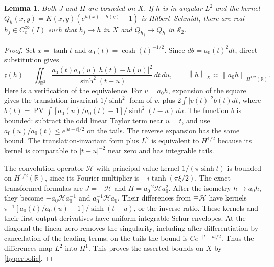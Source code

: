 \documentclass[a4paper,11pt]{amsart}
\newtheorem{lemma}[theorem]{Lemma}
\theoremstyle{remark}\newtheorem{remark}[theorem]{Remark}
\newcommand{\PV}{\operatorname{PV}}
\newcommand{\HS}{\mathcal S_2}
\newcommand{\R}{\mathbb R}
\newcommand{\dd}{\,d}
\newcommand{\norm}[1]{\left\lVert#1\right\rVert}
\begin{document}
\begin{lemma}\label{weighted-approximation}
Both $J$ and $H$ are bounded on $X$. If $h$ is in angular $L^2$ and
the kernel $Q_h(x,y)=K(x,y)(e^{h(x)-h(y)}-1)$ is Hilbert--Schmidt,
there are real $h_j\in C_c^\infty(I)$ such that
$h_j\to h$ in $X$ and $Q_{h_j}\to Q_h$ in $\HS$.
\end{lemma}

\begin{proof}
Set $x=\tanh t$ and $a_0(t)=\cosh(t)^{-1/2}$.
Since $d\theta=a_0(t)^2dt$, direct substitution gives
\begin{equation}\label{hyperbolic}
 \mathfrak e(h)=\iint_{\R^2}
 \frac{a_0(t)a_0(u)|h(t)-h(u)|^2}{\sinh^2(t-u)}\dd t\dd u,
 \qquad \norm h_X\asymp\norm{a_0h}_{H^{1/2}(\R)}.
\end{equation}
Here is a verification of the equivalence. For $v=a_0h$, expansion
of the square gives the translation-invariant $1/\sinh^2$ form of
$v$, plus $2\int |v(t)|^2 b(t)dt$, where
$b(t)=\PV\int[a_0(u)/a_0(t)-1]/\sinh^2(t-u)\dd u$.
The function $b$ is bounded: subtract the odd linear Taylor term
near $u=t$, and use $a_0(u)/a_0(t)\le e^{|u-t|/2}$ on the tails.
The reverse expansion has the same bound. The translation-invariant
form plus $L^2$ is equivalent to $H^{1/2}$ because its kernel is
comparable to $|t-u|^{-2}$ near zero and has integrable tails.

The convolution operator $\mathscr H$ with principal-value kernel
$1/(\pi\sinh t)$ is bounded on $H^{1/2}(\R)$, since its Fourier
multiplier is $-i\tanh(\pi\xi/2)$.
The exact transformed formulas are
$J=-\mathscr H$ and $H=a_0^{-2}\mathscr H a_0^2$.
After the isometry $h\mapsto a_0h$, they become
$-a_0\mathscr H a_0^{-1}$ and $a_0^{-1}\mathscr H a_0$.
Their differences from $\mp\mathscr H$ have kernels
$\pi^{-1}[a_0(t)/a_0(u)-1]/\sinh(t-u)$, or the inverse ratio.
These kernels and their first output derivatives have uniform
integrable Schur envelopes. At the diagonal the linear zero
removes the singularity, including after differentiation by
cancellation of the leading terms; on the tails the bound is
$Ce^{-|t-u|/2}$. Thus the differences map $L^2$ into $H^1$.
This proves the asserted bounds on $X$ by \eqref{hyperbolic}.


\end{proof}
\end{document}
